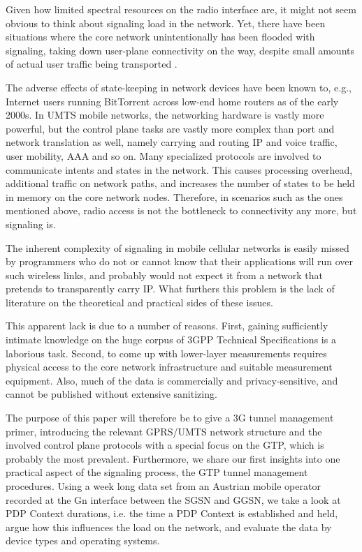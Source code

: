Given how limited spectral resources on the radio interface are, it might not seem obvious to think about signaling load in the network. Yet, there have been situations where the core network unintentionally has been flooded with signaling, taking down user-plane connectivity on the way, despite small amounts of actual user traffic being transported \cite{lt2012docostorm, it2011birdandroid}. 

The adverse effects of state-keeping in network devices have been known to, e.g.,  Internet users running BitTorrent across low-end home routers as of the early 2000s. In \gls{UMTS} mobile networks, the networking hardware is vastly more powerful, but the control plane tasks are vastly more complex than port and network translation as well, namely carrying and routing IP and voice traffic, user mobility, \gls{AAA} and so on. Many specialized protocols are involved to communicate intents and states in the network. This causes processing overhead, additional traffic on network paths, and increases the number of states to be held in memory on the core network nodes. Therefore, in scenarios such as the ones mentioned above, radio access is not the bottleneck to connectivity any more, but signaling is.

The inherent complexity of signaling in mobile cellular networks is easily missed by programmers who do not or cannot know that their applications will run over such wireless links, and probably would not expect it from a network that pretends to transparently carry IP. What furthers this problem is the lack of literature on the theoretical and practical sides of these issues.

This apparent lack is due to a number of reasons. First, gaining sufficiently intimate knowledge on the huge corpus of \gls{3GPP} Technical Specifications %
is a laborious task. Second, to come up with lower-layer measurements requires physical access to the core network infrastructure and suitable measurement equipment. Also, much of the data is commercially and privacy-sensitive, and cannot be published without extensive sanitizing.

The purpose of this paper will therefore be to give a 3G tunnel management primer, introducing the relevant \acrshort{GPRS}/\acrshort{UMTS} network structure and the involved control plane protocols with a special focus on the \gls{GTP}, which is probably the most prevalent. %
Furthermore, we share our first insights into one practical aspect of the signaling process, the \gls{GTP} tunnel management procedures. Using a week long data set from an Austrian mobile operator recorded at the Gn interface between the \gls{SGSN} and \gls{GGSN}, %
we take a look at \gls{PDP} Context durations, i.e. the time a \gls{PDP} Context is established and held, argue how this influences the load on the network, and evaluate the data by device types and operating systems.

